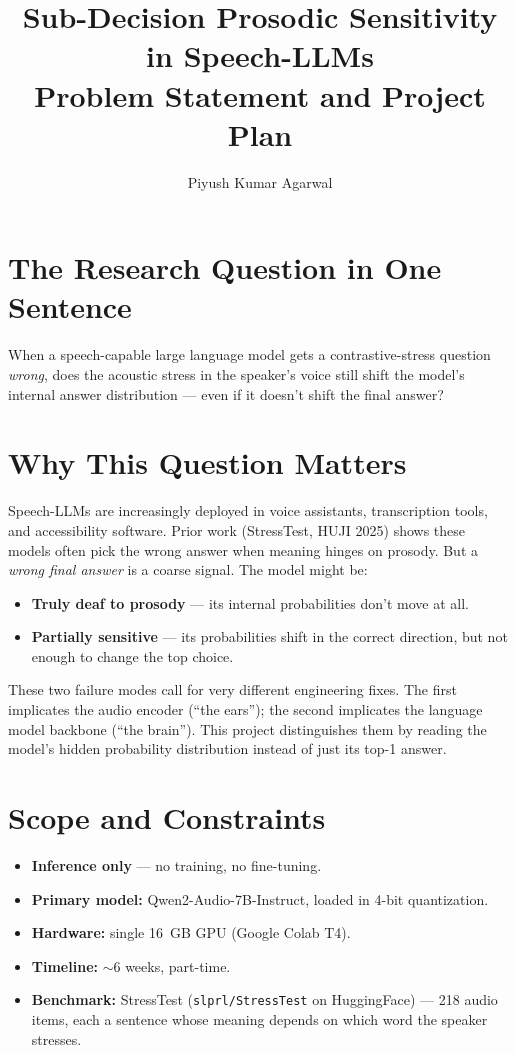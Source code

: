 \documentclass[11pt]{article}
\title{Sub-Decision Prosodic Sensitivity in Speech-LLMs\\
\large Problem Statement and Project Plan}
\author{Piyush Kumar Agarwal}
\date{}
\begin{document}
\maketitle

\section*{The Research Question in One Sentence}

When a speech-capable large language model gets a contrastive-stress
question \emph{wrong}, does the acoustic stress in the speaker's voice
still shift the model's internal answer distribution --- even if it
doesn't shift the final answer?

\section*{Why This Question Matters}

Speech-LLMs are increasingly deployed in voice assistants, transcription
tools, and accessibility software. Prior work (StressTest, HUJI 2025)
shows these models often pick the wrong answer when meaning hinges on
prosody. But a \emph{wrong final answer} is a coarse signal. The model
might be:

\begin{itemize}
    \item \textbf{Truly deaf to prosody} --- its internal probabilities
    don't move at all.
    \item \textbf{Partially sensitive} --- its probabilities shift in
    the correct direction, but not enough to change the top choice.
\end{itemize}

These two failure modes call for very different engineering fixes. The
first implicates the audio encoder (``the ears''); the second
implicates the language model backbone (``the brain''). This project
distinguishes them by reading the model's hidden probability
distribution instead of just its top-1 answer.

\section*{Scope and Constraints}

\begin{itemize}
    \item \textbf{Inference only} --- no training, no fine-tuning.
    \item \textbf{Primary model:} Qwen2-Audio-7B-Instruct, loaded in
    4-bit quantization.
    \item \textbf{Hardware:} single 16~GB GPU (Google Colab T4).
    \item \textbf{Timeline:} $\sim$6 weeks, part-time.
    \item \textbf{Benchmark:} StressTest (\texttt{slprl/StressTest} on
    HuggingFace) --- 218 audio items, each a sentence whose meaning
    depends on which word the speaker stresses.
\end{itemize}
\end{document}
